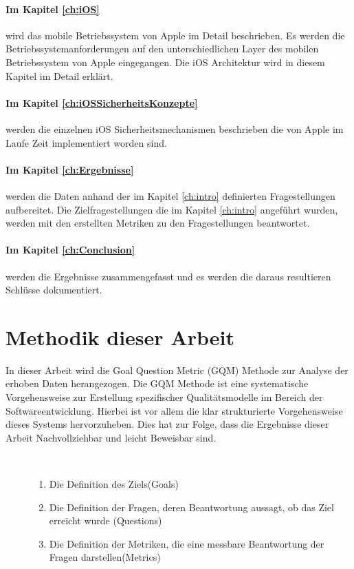 \paragraph{Im Kapitel \ref{ch:iOS}} wird das mobile Betriebssystem von Apple im Detail beschrieben. Es werden die Betriebssystemanforderungen auf den unterschiedlichen Layer des mobilen Betriebssystem von Apple eingegangen. Die iOS Architektur wird in diesem Kapitel im Detail erklärt. 

\paragraph{Im Kapitel \ref{ch:iOSSicherheitsKonzepte}} werden die einzelnen iOS Sicherheitsmechanismen beschrieben die von Apple im Laufe Zeit implementiert worden sind.

\paragraph{Im Kapitel \ref{ch:Ergebnisse}} werden die Daten anhand der im Kapitel \ref{ch:intro} definierten Fragestellungen aufbereitet. Die Zielfragestellungen die im Kapitel \ref{ch:intro} angeführt wurden, werden mit den erstellten Metriken zu den Fragestellungen beantwortet.

\paragraph{Im Kapitel \ref{ch:Conclusion}} werden die Ergebnisse zusammengefasst und es werden die daraus resultieren Schlüsse dokumentiert.

\section{Methodik dieser Arbeit}
\label{sec:MethArbeit}
In dieser Arbeit wird die Goal Question Metric (GQM) Methode zur Analyse der erhoben Daten herangezogen. Die GQM Methode ist eine systematische Vorgehensweise zur Erstellung spezifischer Qualitätsmodelle im Bereich der Softwareentwicklung. Hierbei ist vor allem die klar strukturierte Vorgehensweise dieses Systems hervorzuheben. Dies hat zur Folge, dass die Ergebnisse dieser Arbeit Nachvollziehbar und leicht Beweisbar sind.

\begin{description}
    \item[\parbox{\textwidth} {Die GQM-Methode ist in drei Schritte unterteilt und dient zur Bewertung der erhoben Daten}]~\par
    \begin{enumerate}
        \item Die Definition des Ziels(Goals)
        \item Die Definition der Fragen, deren Beantwortung aussagt, ob das Ziel erreicht wurde (Questions)
        \item Die Definition der Metriken, die eine messbare Beantwortung der Fragen darstellen(Metrics)
    \end{enumerate}
\end{description} 

